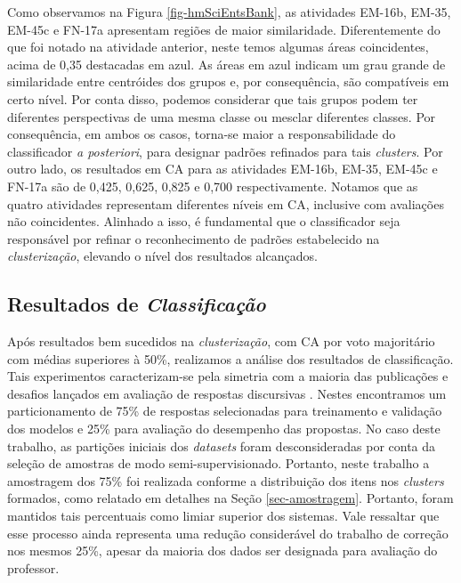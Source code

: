Como observamos na Figura \ref{fig-hmSciEntsBank}, as atividades EM-16b, EM-35, EM-45c e FN-17a apresentam regiões de maior similaridade. Diferentemente do que foi notado na atividade anterior, neste temos algumas áreas coincidentes, acima de 0,35 destacadas em azul. As áreas em azul indicam um grau grande de similaridade entre centróides dos grupos e, por consequência, são compatíveis em certo nível. Por conta disso, podemos considerar que tais grupos podem ter diferentes perspectivas de uma mesma classe ou mesclar diferentes classes. Por consequência, em ambos os casos, torna-se maior a responsabilidade do classificador \textit{a posteriori}, para designar padrões refinados para tais \textit{clusters}. Por outro lado, os resultados em CA para as atividades EM-16b, EM-35, EM-45c e FN-17a são de 0,425, 0,625, 0,825 e 0,700 respectivamente. Notamos que as quatro atividades representam diferentes níveis em CA, inclusive com avaliações não coincidentes. Alinhado a isso, é fundamental que o classificador seja responsável por refinar o reconhecimento de padrões estabelecido na \textit{clusterização}, elevando o nível dos resultados alcançados.

\subsection{Resultados de \textit{Classificação}}
\label{sec-res-classificacao}

Após resultados bem sucedidos na \textit{clusterização}, com CA por voto majoritário com médias superiores à 50\%, realizamos a análise dos resultados de classificação. Tais experimentos caracterizam-se pela simetria com a maioria das publicações e desafios lançados em avaliação de respostas discursivas \cite{burrows2015}. Nestes encontramos um particionamento de 75\% de respostas selecionadas para treinamento e validação dos modelos e 25\% para avaliação do desempenho das propostas. No caso deste trabalho, as partições iniciais dos \textit{datasets} foram desconsideradas por conta da seleção de amostras de modo semi-supervisionado. Portanto, neste trabalho a amostragem dos 75\% foi realizada conforme a distribuição dos itens nos \textit{clusters} formados, como relatado em detalhes na Seção \ref{sec-amostragem}. Portanto, foram mantidos tais percentuais como limiar superior dos sistemas. Vale ressaltar que esse processo ainda representa uma redução considerável do trabalho de correção nos mesmos 25\%, apesar da maioria dos dados ser designada para avaliação do professor.


